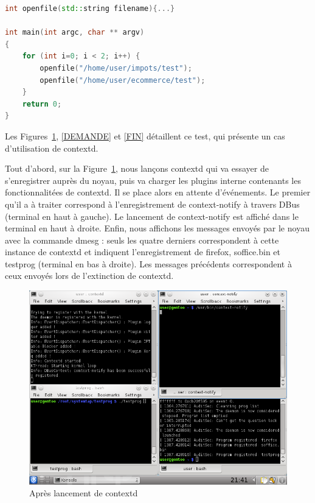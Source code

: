 \documentclass[pdftex,a4paper,titlepage,11pt]{article}
\begin{document}
\begin{lstlisting}[language=C++]
int openfile(std::string filename){...}

int main(int argc, char ** argv)
{
	for (int i=0; i < 2; i++) {
		openfile("/home/user/impots/test");
		openfile("/home/user/ecommerce/test");
	}
	return 0;
}
\end{lstlisting}

Les Figures~\ref{INI}, \ref{DEMANDE} et \ref{FIN} détaillent ce test, qui présente un cas d'utilisation de contextd.

Tout d'abord, sur la Figure~\ref{INI}, nous lançons contextd qui va essayer de s'enregistrer auprès du noyau, puis va charger les plugins interne contenants les fonctionnalitées de contextd. Il se place alors en attente d'événements. Le premier qu'il a à traiter correspond à l'enregistrement de context-notify à travers DBus (terminal en haut à gauche). Le lancement de context-notify est affiché dans le terminal en haut à droite. Enfin, nous affichons les messages envoyés par le noyau avec la commande dmesg : seuls les quatre derniers correspondent à cette instance de contextd et indiquent l'enregistrement de firefox, soffice.bin et testprog (terminal en bas à droite). Les messages précédents correspondent à ceux envoyés lors de l'extinction de contextd.

\begin{figure}%
	\centering
	\includegraphics[scale=0.5]{attachements/capture_ini.png}
	\caption{Après lancement de contextd}
	\label{INI}
\end{figure}
\end{document}
